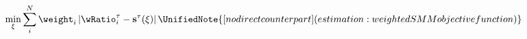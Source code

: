   \begin{equation}
    \min_{\xi}\sum_{i}^{N}\weight _{i}\left|\wRatio_{i}^{\tau }-\mathbf{s}^{\tau}(\xi )\right|\label{eq:StructEstim}
    \UnifiedNote{[no direct counterpart] (estimation: weighted SMM objective function)}
  \end{equation}

